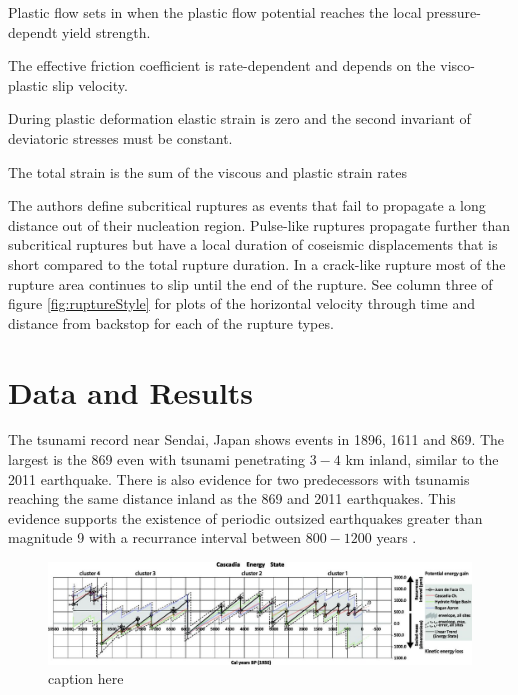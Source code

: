 \documentclass[draft,jgrga]{agutex}
\begin{document}
	
Plastic flow sets in when the plastic flow potential reaches the local pressure-dependt yield strength.

The effective friction coefficient is rate-dependent and depends on the visco-plastic slip velocity. 

During plastic deformation elastic strain is zero and the second invariant of deviatoric stresses must be constant. 

The total strain is the sum of the viscous and plastic strain rates 


 The authors define subcritical ruptures as events that fail to propagate a long distance out of their nucleation region. Pulse-like ruptures propagate further than subcritical ruptures but have a local duration of coseismic displacements that is short compared to the total rupture duration. In a crack-like rupture most of the rupture area continues to slip until the end of the rupture. See column three of figure \ref{fig:ruptureStyle} for plots of the horizontal velocity through time and distance from backstop for each of the rupture types.


\section{Data and Results}
The tsunami record near Sendai, Japan shows events in 1896, 1611 and 869. The largest is the 869 even with tsunami penetrating $3-4$ km inland, similar to the 2011 earthquake. There is also evidence for two predecessors with tsunamis reaching the same distance inland as the 869 and 2011 earthquakes. This evidence supports the existence of periodic outsized earthquakes greater than magnitude 9 with a recurrance interval between $800 -1200$ years \citep{Goldfinger2013}.

\begin{figure}
\hspace{-1cm}
	\includegraphics[width=1.1\linewidth]{./Figures/Goldfinger/F4large.jpg}
	\caption{caption here}
	\label{fig:energyCycle}
\end{figure}
\end{document}
